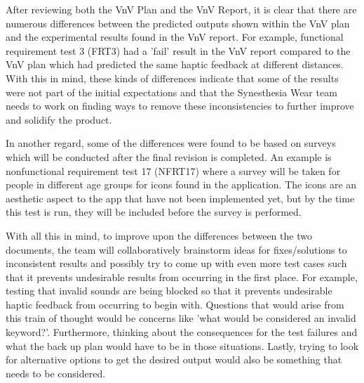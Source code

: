 \documentclass[12pt, titlepage]{article}
\begin{document}
After reviewing both the VnV Plan and the VnV Report, it is clear that there are numerous differences between the predicted outputs shown within the VnV plan and the experimental results found in the VnV report. For example, functional requirement test 3 (FRT3) had a 'fail' result in the VnV report compared to the VnV plan which had predicted the same haptic feedback at different distances. With this in mind, these kinds of differences indicate that some of the results were not part of the initial expectations and that the Synesthesia Wear team needs to work on finding ways to remove these inconsistencies to further improve and solidify the product. 

In another regard, some of the differences were found to be based on surveys which will be conducted after the final revision is completed. An example is nonfunctional requirement test 17 (NFRT17) where a survey will be taken for people in different age groups for icons found in the application. The icons are an aesthetic aspect to the app that have not been implemented yet, but by the time this test is run, they will be included before the survey is performed. 

With all this in mind, to improve upon the differences between the two documents, the team will collaboratively brainstorm ideas for fixes/solutions to inconsistent results and possibly try to come up with even more test cases such that it prevents undesirable results from occurring in the first place. For example, testing that invalid sounds are being blocked so that it prevents undesirable haptic feedback from occurring to begin with. Questions that would arise from this train of thought would be concerns like 'what would be considered an invalid keyword?'. Furthermore, thinking about the consequences for the test failures and what the back up plan would have to be in those situations. Lastly, trying to look for alternative options to get the desired output would also be something that needs to be considered.
\end{document}
